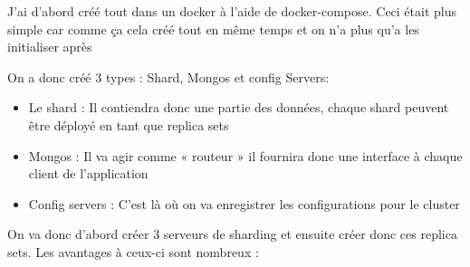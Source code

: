 J'ai d'abord créé tout dans un docker à l'aide de docker-compose.
Ceci était plus simple car comme ça cela créé tout en même temps et on n'a plus qu'a les initialiser
après

On a donc créé 3 types : Shard, Mongos et config Servers:

\begin{itemize}
    \item Le shard : Il contiendra donc une partie des données, chaque shard peuvent être déployé en
    tant que replica sets
    \item Mongos : Il va agir comme « routeur » il fournira donc une interface à chaque client de
    l'application
    \item Config servers : C'est là où on va enregistrer les configurations pour le cluster
\end{itemize}

On va donc d'abord créer 3 serveurs de sharding et ensuite créer donc ces replica sets.
Les avantages à ceux-ci sont nombreux :

